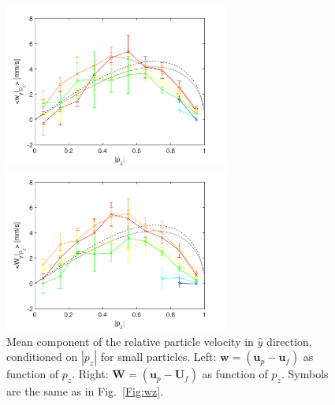 \documentclass[]{jfm}
\begin{document}
\begin{figure}
\centering
\begin{minipage}{.5\textwidth}
  \centering
  \includegraphics[width=2.9in]{figures/wy-local-small.pdf}
\end{minipage}%
\begin{minipage}{.5\textwidth}
  \centering
  \includegraphics[width=2.9in]{figures/wy-U-small.pdf}
\end{minipage}
\caption{Mean component of the relative particle velocity in $\hat{y}$ direction, conditioned on $|p_z|$ for small particles. Left: $\mathbf{w}=(\mathbf{u}_p-\mathbf{u}_f)$ as function of $p_z$. Right: $\mathbf{W}=(\mathbf{u}_p-\mathbf{U}_f)$ as function of $p_z$. Symbols are the same as in Fig.~\ref{Fig:wz}.}
\label{Fig:wy}
\end{figure}
\end{document}

